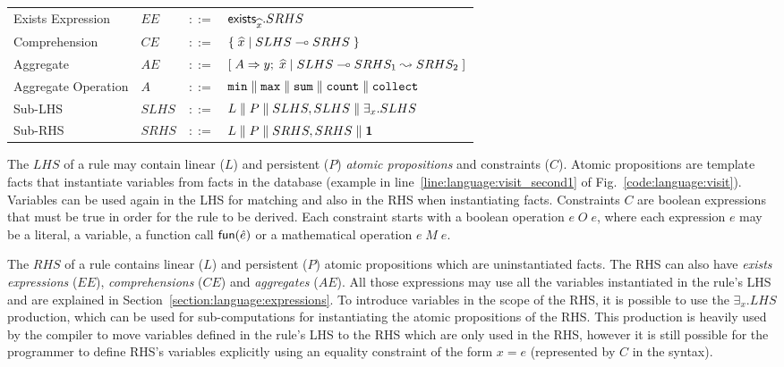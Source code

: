 \begin{table}[h]
\begin{tabular}{ l l c l }
  
  Exists Expression & $EE$ & $::=$ & $\mathsf{exists}_{\widehat{x}}. SRHS$ \\
  Comprehension & $CE$ & $::=$ & $\{ \; \widehat{x} \; | \; SLHS \multimap SRHS \; \}$ \\

  Aggregate & $AE$ & $::=$ & $[\; A \Rightarrow y; \; \widehat{x} \; | \; SLHS \multimap SRHS_1 \leadsto SRHS_2 \;]$ \\
  Aggregate Operation & $A$ & $::=$ & $\mathtt{min} \; \Vert \; \mathtt{max} \; \Vert \;
\mathtt{sum} \; \Vert \; \mathtt{count} \; \Vert \; \mathtt{collect}$ \\
  
  Sub-LHS & $SLHS$ & $::=$ & $L \; \Vert \; P \; \Vert \; SLHS, SLHS \; \Vert \; \exists_{x}. SLHS$\\
  Sub-RHS & $SRHS$ & $::=$ & $L \; \Vert \; P \; \Vert \; SRHS, SRHS \; \Vert \; \mathbf{1}$\\
  
\end{tabular}
\label{tbl:language:ast}
\end{table}

The $LHS$ of a rule may contain linear ($L$) and persistent ($P$) \emph{atomic
propositions} and constraints ($C$). Atomic propositions are template facts that
instantiate variables from facts in the database (example in
line~\ref{line:language:visit_second1} of Fig.~\ref{code:language:visit}).
Variables can be used again in the LHS for matching and also in the RHS when
instantiating facts.  Constraints $C$ are boolean expressions that must be true
in order for the rule to be derived. Each constraint starts with a boolean
operation $e \; O \; e$, where each expression $e$ may be a literal, a variable,
a function call $\mathsf{fun}(\hat{e})$ or a mathematical operation $e \; M \; e$.

The $RHS$ of a rule contains linear ($L$) and persistent ($P$) atomic
propositions which are uninstantiated facts. The RHS can also have \emph{exists
expressions} ($EE$), \emph{comprehensions} ($CE$) and \emph{aggregates} ($AE$).
All those expressions may use all the variables instantiated in the rule's LHS
and are explained in Section~\ref{section:language:expressions}.
To introduce variables in the scope of the RHS, it is possible to use the
$\exists_x. LHS$ production, which can be used for sub-computations for
instantiating the atomic propositions of the RHS. This production is heavily
used by the compiler to move variables defined in the rule's LHS to the RHS
which are only used in the RHS, however it is still possible for the programmer
to define RHS's variables explicitly using an equality constraint of the form $x
= e$ (represented by $C$ in the syntax).


